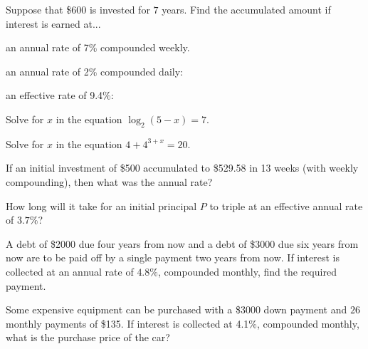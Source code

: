 \documentclass[11pt]{exam}
\begin{document}
\addpoints

\noindent
\begin{center}
\gradetable[v][pages]  %
\end{center}


\newpage %

%
%
%

\begin{questions}
\question[3] Suppose that \$600 is invested for $7$ years.  Find the accumulated amount if interest is earned at...
\begin{compactenum}[(a)]
\item an annual rate of 7\% compounded weekly.
\vspace{7cm}

\item an annual rate of 2\% compounded daily:
\vspace{7cm}

\item an effective rate of 9.4\%:
\end{compactenum}
\newpage

\question[3] Solve for $x$ in the equation $\log_2(5-x)=7$.
\vspace{12cm}

\question[3] Solve for $x$ in the equation $4 + 4^{3+x} = 20$.
\newpage

\question[2] If an initial investment of \$500 accumulated to \$529.58 in 13 weeks (with weekly compounding), then what was the annual rate?
\vspace{10cm}

\question[2] How long will it take for an initial principal $P$ to triple at an effective annual rate of $3.7\%$?
\newpage

\question[3] A debt of \$2000 due four years from now and a debt of \$3000 due six years from now are to be paid off by a single payment two years from now.  If interest is collected at an annual rate of $4.8\%$, compounded monthly, find the required payment.
\newpage

\question[3] Some expensive equipment can be purchased with a \$3000 down payment and $26$ monthly payments of \$135.  If interest is collected at 4.1\%, compounded monthly, what is the purchase price of the car?


\end{questions}
\end{document}
